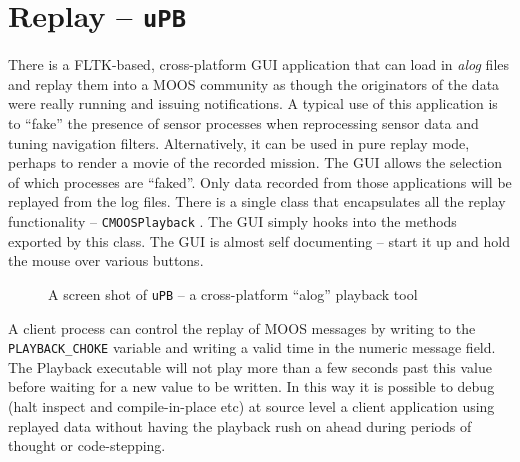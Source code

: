 \documentclass[a4paper,10pt]{article}
\newcommand{\Code}[1]{\texttt{#1} }
\newcommand{\code}[1]{\Code{#1} }
\begin{document}
\newpage

\section{Replay -- \code{uPB}}
There is a FLTK-based, cross-platform GUI application that can
load in {\it{alog}} files and replay them into a MOOS community as
though the originators of the data were really running and issuing
notifications. A typical use of this application is to ``fake''
the presence of sensor processes when reprocessing sensor data and
tuning navigation filters. Alternatively, it can be used in pure
replay mode, perhaps to render a movie of the recorded mission. The
GUI allows the selection of which processes are ``faked''. Only
data recorded from those applications will be replayed from the
log files.  There is a single class that encapsulates all the
replay functionality -- \code{CMOOSPlayback}. The GUI simply hooks
into the methods exported by this class. The GUI is almost self
documenting -- start it up and hold the mouse over various buttons.

\begin{figure}
\center {} \caption{A
screen shot of \code{uPB} -- a cross-platform ``alog'' playback
tool}
\end{figure}

A client process can control the replay of MOOS messages by
writing to the \code{PLAYBACK\_CHOKE} variable and writing a valid
time in the numeric message field. The Playback executable will
not play more than a few seconds past this value before waiting
for a new value to be written. In this way  it is possible to
debug (halt inspect and compile-in-place etc) at source level a
client application using replayed data without having the playback
rush on ahead during periods of thought or code-stepping.
\end{document}
